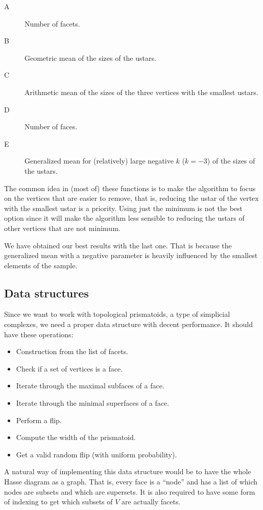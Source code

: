 \documentclass[12pt,a4paper]{article}
\theoremstyle{plain}
\theoremstyle{definition}
\begin{document}
\begin{description}
  \item[A] Number of facets.
  \item[B] Geometric mean of the sizes of the ustars.
  \item[C] Arithmetic mean of the sizes of the three vertices with the smallest ustars.
  \item[D] Number of faces.
  \item[E] Generalized mean for (relatively) large negative $k$ ($k=-3$) of the sizes of the ustars.
\end{description}

The common idea in (most of) these functions is to make the algorithm to focus on the vertices that are easier to remove, that is, reducing the ustar of the vertex with the smallest ustar is a priority. Using just the minimum is not the best option since it will make the algorithm less sensible to reducing the ustars of other vertices that are not minimum.

We have obtained our best results with the last one. That is because the generalized mean with a negative parameter is heavily influenced by the smallest elements of the sample.

\subsection{Data structures}

Since we want to work with topological prismatoids, a type of simplicial complexes, we need a proper data structure with decent performance. It should have these operations:

\begin{itemize}
  \item Construction from the list of facets.
  \item Check if a set of vertices is a face.
  \item Iterate through the maximal subfaces of a face.
  \item Iterate through the minimal superfaces of a face.
  \item Perform a flip.
  \item Compute the width of the prismatoid.
  \item Get a valid random flip (with uniform probability).
\end{itemize}

A natural way of implementing this data structure would be to have the whole Hasse diagram as a graph. That is, every face is a ``node'' and has a list of which nodes are subsets and which are supersets. It is also required to have some form of indexing to get which subsets of $V$ are actually facets.
\end{document}

